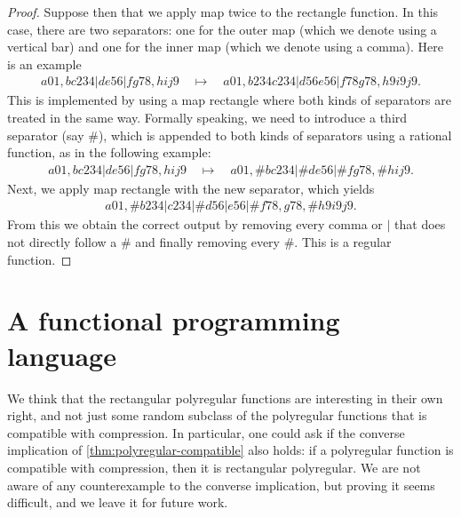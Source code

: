 \documentclass[a4paper,UKenglish,cleveref, autoref, thm-restate]{lipics-v2021}
\begin{document}
\begin{proof}
        Suppose then that we apply map twice to the rectangle function. In this case, there are two separators: one for the outer map (which we denote using a vertical bar) and one for the inner map (which we denote using a comma). 
        Here is an example 
        \begin{align*}
        a01,bc234|de56|fg78,hij9  \quad \mapsto \quad 
        a01,b234c234|d56e56|f78g78,h9i9j9.
        \end{align*}
        This is implemented by using a map rectangle where  both kinds of separators are treated in the same way. Formally speaking, we need to introduce a third separator (say $\#$), which is appended to both kinds of separators using a rational function, as in the following example:
                \begin{align*}
                    a01,bc234|de56|fg78,hij9  \quad \mapsto \quad
                    a01,\#bc234|\#de56|\#fg78,\#hij9 .
        \end{align*}
        Next, we apply map rectangle with the new separator, which yields
        \begin{align*}
                    a01,\# b234|c234|\#d56|e56|\#f78,g78,\#h9i9j9 .
        \end{align*}
        From this we obtain the correct output by removing every comma or $|$ that  does not directly follow a $\#$ 
        and finally removing every $\#$.  This is a regular function.
    \end{proof}



\newcommand{\reverseterm}{\mathtt{reverse}}
\newcommand{\leftterm}{\mathtt{Left}}
\newcommand{\rightterm}{\mathtt{Right}}
\newcommand{\fstterm}{\mathtt{fst}}
\newcommand{\sndterm}{\mathtt{snd}}
\newcommand{\mapterm}{\mathtt{map}}
\newcommand{\casesterm}{\mathtt{either}}
\newcommand{\splitterm}{\mathtt{split}}
\newcommand{\multterm}{\mathtt{mult}}
\newcommand{\headtailterm}{\mathtt{headtail}}
\newcommand{\concatterm}{\mathtt{concat}}
\newcommand{\headterm}{\mathtt{head}}
\newcommand{\tailterm}{\mathtt{tail}}
\newcommand{\blockterm}{\mathtt{block}}
\newcommand{\typecolor}[1]{{\color{cyan}#1}}
\newcommand{\church}[2]{#1^{\typecolor{#2}}}
\newcommand{\height}{\mathtt{height}}

\section{A functional programming language}
\label{sec:functional-lang}
We think that the rectangular polyregular functions are interesting in their own right, and not just some random subclass of the polyregular functions that  is compatible with compression. In particular, one could ask if the converse implication of \cref{thm:polyregular-compatible} also holds: if a polyregular function is compatible with compression, then it is rectangular polyregular. We are not aware of any counterexample to the converse implication, but proving it   seems difficult, and we leave it for future work.  
\end{document}
